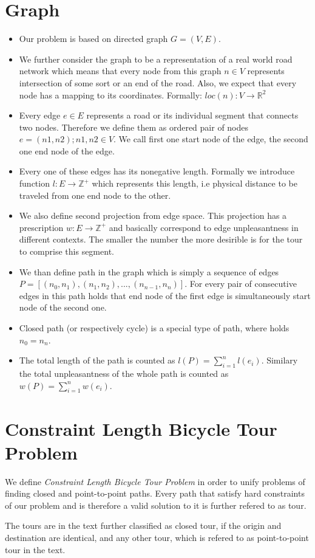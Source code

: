 \documentclass{ctuthesis}
\begin{document}
\section{Graph}
\begin{itemize}
	\item Our problem is based on directed graph \(G=(V, E)\).
	\item We further consider the graph to be a representation of a real world road network which means that every node from this graph \(n \in V\) represents intersection of some sort or an end of the road. Also, we expect that every node has a mapping to its coordinates. Formally: \(loc(n): V \rightarrow \mathbb{R}^2\)
	\item Every edge \(e \in E\) represents a road or its individual segment that connects two nodes. Therefore we define them as ordered pair of nodes \(e=(n1, n2); n1,n2 \in V\). We call first one start node of the edge, the second one end node of the edge.
	\item Every one of these edges has its nonegative length. Formally we introduce function \(l:E \rightarrow \mathbb{Z^+}\) which represents this length, i.e physical distance to be traveled from one end node to the other.
	\item We also define second projection from edge space. This projection has a prescription \(w:E \rightarrow \mathbb{Z^+}\) and basically correspond to edge unpleasantness in different contexts. The smaller the number the more desirible is for the tour to comprise this segment.
	\item We than define path in the graph which is simply a sequence of edges \(P = [(n_0, n_1), (n_1, n_2), ..., (n_{n-1}, n_n)]\). For every pair of consecutive edges in this path holds that end node of the first edge is simultaneously start node of the second one.
	\item Closed path (or respectively cycle) is a special type of path, where holds \(n_0 = n_n\). 
	\item The total length of the path is counted as \(l(P)=\sum_{i=1}^{n}{l(e_i)}\). Similary the total unpleasantness of the whole path is counted as \(w(P)=\sum_{i=1}^{n}{w(e_i)}\).
\end{itemize}


\section{Constraint Length Bicycle Tour Problem}
We define \textit{Constraint Length Bicycle Tour Problem} in order to unify problems of finding closed and point-to-point paths. Every path that satisfy hard constraints of our problem and is therefore a valid solution to it is further refered to as tour. \par
The tours are in the text further classified as closed tour, if the origin and destination are identical, and any other tour, which is refered to as point-to-point tour in the text.
\end{document}
